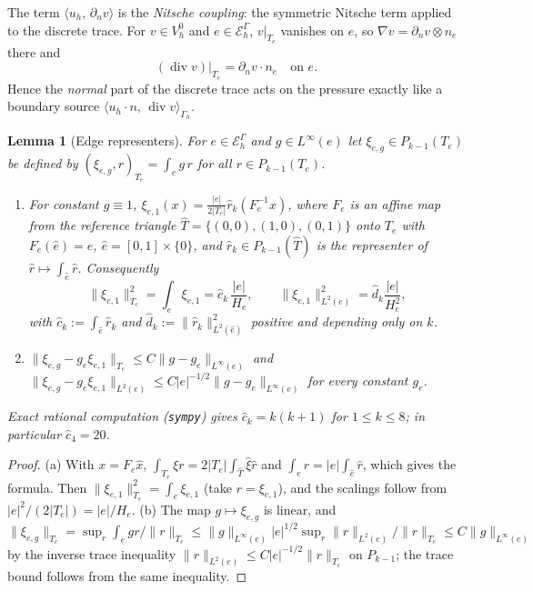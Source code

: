 \documentclass[11pt,reqno]{amsart}
\theoremstyle{plain}
\newtheorem{lemma}[theorem]{Lemma}
\theoremstyle{definition}
\newcommand{\Gh}{\Gamma_h}
\newcommand{\EG}{\mathcal E_h^\Gamma}
\newcommand{\VO}{V_h^0}
\newcommand{\dn}{\partial_n}
\newcommand{\ip}[2]{\langle #1,\, #2\rangle}
\newcommand{\norm}[1]{\lVert #1\rVert}
\renewcommand{\div}{\operatorname{div}}
\newcommand{\chat}{\hat c_k}
\begin{document}
The term $\ip{u_h}{\dn v}$ is the \emph{Nitsche coupling}: the symmetric Nitsche term applied to the discrete trace. For $v\in\VO$ and $e\in\EG$, $v|_{T_e}$ vanishes on $e$, so $\nabla v=\dn v\otimes n_e$ there and
\begin{equation}\label{pd:eq:divtrace}
(\div v)|_{T_e}=\dn v\cdot n_e\quad\text{on }e .
\end{equation}
Hence the \emph{normal} part of the discrete trace acts on the pressure exactly like a boundary source $\ip{u_h\cdot n}{\div v}_{\Gh}$.

\begin{lemma}[Edge representers]\label{pd:lem:rep}
For $e\in\EG$ and $g\in L^\infty(e)$ let $\xi_{e,g}\in P_{k-1}(T_e)$ be defined by $(\xi_{e,g},r)_{T_e}=\int_eg\,r$ for all $r\in P_{k-1}(T_e)$.
\begin{enumerate}[label=(\alph*)]
\item For constant $g\equiv1$, $\xi_{e,1}(x)=\frac{|e|}{2|T_e|}\hat r_k(F_e^{-1}x)$, where $F_e$ is an affine map from the reference triangle $\hat T=\{(0,0),(1,0),(0,1)\}$ onto $T_e$ with $F_e(\hat e)=e$, $\hat e=[0,1]\times\{0\}$, and $\hat r_k\in P_{k-1}(\hat T)$ is the representer of $\hat r\mapsto\int_{\hat e}\hat r$. Consequently
\[
\norm{\xi_{e,1}}^2_{T_e}=\int_e\xi_{e,1}=\chat\,\frac{|e|}{H_e},\qquad \norm{\xi_{e,1}}^2_{L^2(e)}=\hat d_k\frac{|e|}{H_e^2},
\]
with $\chat:=\int_{\hat e}\hat r_k$ and $\hat d_k:=\norm{\hat r_k}^2_{L^2(\hat e)}$ positive and depending only on $k$.
\item $\norm{\xi_{e,g}-g_e\xi_{e,1}}_{T_e}\le C\norm{g-g_e}_{L^\infty(e)}$ and $\norm{\xi_{e,g}-g_e\xi_{e,1}}_{L^2(e)}\le C|e|^{-1/2}\norm{g-g_e}_{L^\infty(e)}$ for every constant $g_e$.
\end{enumerate}
Exact rational computation (\texttt{sympy}) gives $\chat=k(k+1)$ for $1\le k\le8$; in particular $\hat c_4=20$.
\end{lemma}

\begin{proof}
(a) With $x=F_e\hat x$, $\int_{T_e}\xi r=2|T_e|\int_{\hat T}\hat\xi\hat r$ and $\int_er=|e|\int_{\hat e}\hat r$, which gives the formula. Then $\norm{\xi_{e,1}}^2_{T_e}=\int_e\xi_{e,1}$ (take $r=\xi_{e,1}$), and the scalings follow from $|e|^2/(2|T_e|)=|e|/H_e$. (b) The map $g\mapsto\xi_{e,g}$ is linear, and $\norm{\xi_{e,g}}_{T_e}=\sup_r\int_egr/\norm r_{T_e}\le\norm g_{L^\infty(e)}|e|^{1/2}\sup_r\norm r_{L^2(e)}/\norm r_{T_e}\le C\norm g_{L^\infty(e)}$ by the inverse trace inequality $\norm r_{L^2(e)}\le C|e|^{-1/2}\norm r_{T_e}$ on $P_{k-1}$; the trace bound follows from the same inequality.
\end{proof}
\end{document}
